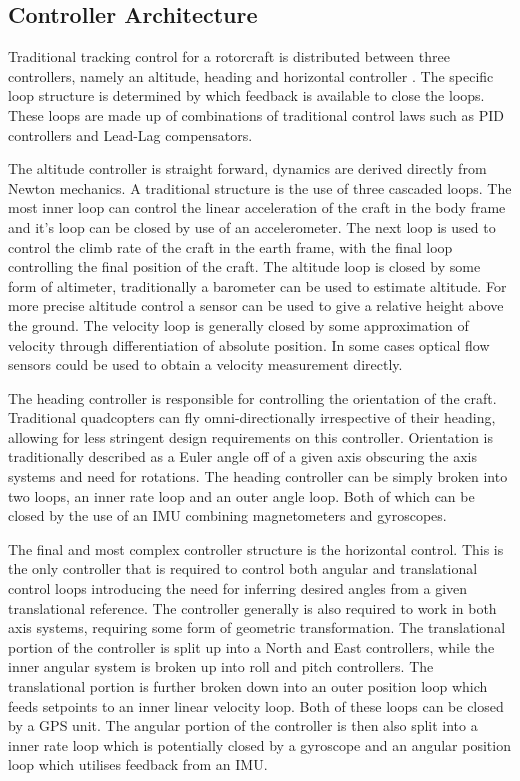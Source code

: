 	\subsection{Controller Architecture}
	Traditional tracking control for a rotorcraft is distributed between three controllers, namely an altitude, heading and horizontal controller \cite{Moller2015, Mellinger2014}. The specific loop structure is determined by which feedback is available to close the loops. These loops are made up of combinations of traditional control laws such as PID controllers and Lead-Lag compensators.
	
	The altitude controller is straight forward, dynamics are derived directly from Newton mechanics. A traditional structure is the use of three cascaded loops. The most inner loop can control the linear acceleration of the craft in the body frame and it's loop can be closed by use of an accelerometer. The next loop is used to control the climb rate of the craft in the earth frame, with the final loop controlling the final position of the craft. The altitude loop is closed by some form of altimeter, traditionally a barometer can be used to estimate altitude. For more precise altitude control a sensor can be used to give a relative height above the ground. The velocity loop is generally closed by some approximation of velocity through differentiation of absolute position. In some cases optical flow sensors could be used to obtain a velocity measurement directly.
	
	The heading controller is responsible for controlling the orientation of the craft. Traditional quadcopters can fly omni-directionally irrespective of their heading, allowing for less stringent design requirements on this controller. Orientation is traditionally described as a Euler angle off of a given axis obscuring the axis systems and need for rotations. The heading controller can be simply broken into two loops, an inner rate loop and an outer angle loop. Both of which can be closed by the use of an IMU combining magnetometers and gyroscopes.
	
	The final and most complex controller structure is the horizontal control. This is the only controller that is required to control both angular and translational control loops introducing the need for inferring desired angles from a given translational reference. The controller generally is also required to work in both axis systems, requiring some form of geometric transformation. The translational portion of the controller is split up into a North and East controllers, while the inner angular system is broken up into roll and pitch controllers. The translational portion is further broken down into an outer position loop which feeds setpoints to an inner linear velocity loop. Both of these loops can be closed by a GPS unit. The angular portion of the controller is then also split into a inner rate loop which is potentially closed by a gyroscope and an angular position loop which utilises feedback from an IMU.
	
